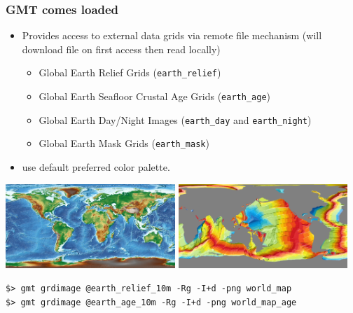 \documentclass[unknownkeysallowed]{beamer}
\begin{document}
\begin{frame}[fragile=singleslide]
\frametitle{GMT comes loaded}
	\begin{itemize}
		\item Provides access to external data grids via remote file mechanism (will download file on first access then read locally)
		\begin{itemize}	
			\item Global Earth Relief Grids ({\tt earth\_relief})
			\item Global Earth Seafloor Crustal Age Grids ({\tt earth\_age})
			\item Global Earth Day/Night Images ({\tt earth\_day} and {\tt earth\_night})
			\item Global Earth Mask Grids ({\tt earth\_mask})
		\end{itemize}
		\item use default preferred color palette.
	\end{itemize}

	\begin{center}
			\includegraphics[width=0.48\textwidth]{../figures/gmt_world_map.png}	
			\includegraphics[width=0.48\textwidth]{../figures/gmt_world_map_age.png}	
	\end{center}
	{\scriptsize	
	\begin{verbatim}
$> gmt grdimage @earth_relief_10m -Rg -I+d -png world_map
$> gmt grdimage @earth_age_10m -Rg -I+d -png world_map_age
	\end{verbatim}
	}

\end{frame}
\end{document}

